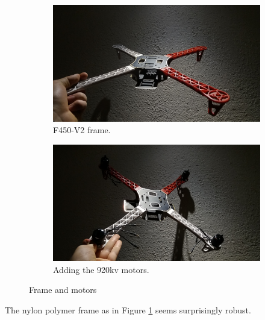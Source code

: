 \begin{figure}[H]
\begin{subfigure}{0.5\textwidth}
\centering
\includegraphics[scale=0.1]{images/drone-build-frame.jpg}
\caption{F450-V2 frame.}
\label{fig:frame}
\end{subfigure}
\begin{subfigure}{0.5\textwidth}
\centering
\includegraphics[scale=0.1]{images/drone-build-motors.jpg}
\caption{Adding the 920kv motors.}
\label{fig:motors}
\end{subfigure}
\caption{Frame and motors}
\label{fig:frame_motors}
\end{figure}

The nylon polymer frame as in Figure \ref{fig:frame} seems surprisingly robust.\\

